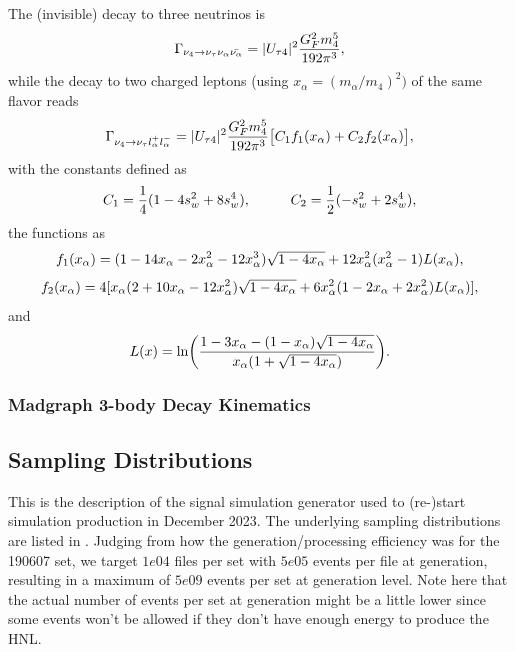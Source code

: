 The (invisible) decay to three neutrinos is
\begin{equation}
    \Gamma_{\nu_4 \rightarrow \nu_\tau \nu_\alpha \bar{\nu_\alpha}} = |U_{\tau4}|^2 \frac{G_F^2 m_4^5}{192\pi^3},
    \labeq{gamma_nu_nu_nu}
\end{equation}
while the decay to two charged leptons (using $x_\alpha = (m_\alpha/m_4)^2)$ of the same flavor reads
\begin{equation}
    \Gamma_{\nu_4 \rightarrow \nu_\tau l_\alpha^+ l_\alpha^-} = |U_{\tau4}|^2 \frac{G_F^2 m_4^5}{192\pi^3} \big[ C_1 f_1(x_\alpha) + C_2 f_2(x_\alpha) \big],
    \labeq{gamma_nu_ll_full}
\end{equation}
with the constants defined as
\begin{equation}
    C_1 = \frac{1}{4}(1-4s_w^2+8s_w^4) , \hspace{1cm} C_2 = \frac{1}{2}(-s_w^2+2s_w^4),
    \labeq{gamma_nu_ll_c1_c2}
\end{equation} 
the functions as
\begin{equation}
    f_1(x_\alpha) = (1-14x_\alpha-2x_\alpha^2-12x_\alpha^3)\sqrt{1-4x_\alpha}+12x_\alpha^2(x_\alpha^2-1)L(x_\alpha),
    \labeq{gamma_nu_ll_f1}
\end{equation}
\begin{equation}
    f_2(x_\alpha) = 4[x_\alpha(2+10x_\alpha-12x_\alpha^2)\sqrt{1-4x_\alpha}+6x_\alpha^2(1-2x_\alpha+2x_\alpha^2)L(x_\alpha)],
    \labeq{gamma_nu_ll_f2}
\end{equation}
and
\begin{equation}
    L(x) = \ln \biggl( \frac{ 1-3x_\alpha-(1-x_\alpha)\sqrt{1-4x_\alpha} }{ x_\alpha(1+\sqrt{1-4x_\alpha}) } \biggr).
    \labeq{gamma_nu_ll_l}
\end{equation}


\subsubsection{Madgraph 3-body Decay Kinematics}



\subsection{Sampling Distributions}

This is the description of the signal simulation generator used to (re-)start simulation production in December 2023. The underlying sampling distributions are listed in . Judging from how the generation/processing efficiency was for the 190607 set, we target $1e04$ files per set with $5e05$ events per file at generation, resulting in a maximum of $5e09$ events per set at generation level. Note here that the actual number of events per set at generation might be a little lower since some events won't be allowed if they don't have enough energy to produce the HNL.

